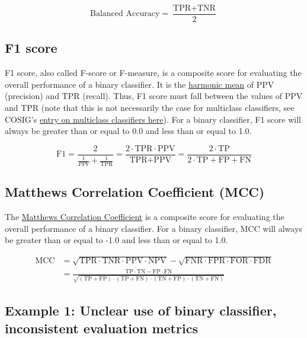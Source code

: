 \documentclass[letterpaper, 12pt]{article}
\begin{document}
$$\textrm{Balanced Accuracy} = \frac{\textrm{TPR} + \textrm{TNR}}{2}$$

\subsection*{F1 score}

F1 score, also called F-score or F-measure, is a composite score for evaluating the overall performance of a binary classifier. It is the \href{https://en.wikipedia.org/wiki/Harmonic_mean}{harmonic mean} of PPV (precision) and TPR (recall). Thus, F1 score must fall between the values of PPV and TPR (note that this is not necessarily the case for multiclass classifiers, see COSIG's \href{https://osf.io/5x2rp}{entry on multiclass classifiers here}). For a binary classifier, F1 score will always be greater than or equal to 0.0 and less than or equal to 1.0.

$$\textrm{F1} = \frac{2}{\frac{1}{PPV} + \frac{1}{\textrm{TPR}}} = \frac{2 \cdot \textrm{TPR} \cdot \textrm{PPV}}{\textrm{TPR} + \textrm{PPV}} = \frac{2 \cdot \textrm{TP}}{2 \cdot \textrm{TP} + \textrm{FP} + \textrm{FN}}$$

\subsection*{Matthews Correlation Coefficient (MCC)}

The \href{https://en.wikipedia.org/wiki/Phi_coefficient}{Matthews Correlation Coefficient} is a composite score for evaluating the overall performance of a binary classifier. For a binary classifier, MCC will always be greater than or equal to -1.0 and less than or equal to 1.0.

\begin{align*} 
\textrm{MCC} &= \sqrt{\textrm{TPR} \cdot \textrm{TNR} \cdot \textrm{PPV} \cdot \textrm{NPV}} - \sqrt{\textrm{FNR} \cdot \textrm{FPR} \cdot \textrm{FOR} \cdot \textrm{FDR}}\\ 
 &= \frac{\textrm{TP}\cdot\textrm{TN}-\textrm{FP}\cdot\textrm{FN}}{\sqrt{ (\textrm{TP}+\textrm{FP})\cdot(\textrm{TP}+\textrm{FN})\cdot(\textrm{TN}+\textrm{FP})\cdot(\textrm{TN}+\textrm{FN}) }}\
\end{align*}

\pagebreak

\subsection*{Example 1: Unclear use of binary classifier, inconsistent evaluation metrics}
\end{document}
